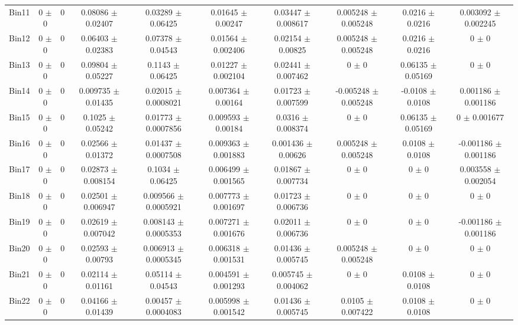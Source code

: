 \begin{tabular}{@{\extracolsep{4pt}}lccccccccc@{}}
     Bin11 & 0 $\pm$ 0 & 0 & 0.08086 $\pm$ 0.02407 & 0.03289 $\pm$ 0.06425 & 0.01645 $\pm$ 0.00247 & 0.03447 $\pm$ 0.008617 & 0.005248 $\pm$ 0.005248 & 0.0216 $\pm$ 0.0216 & 0.003092 $\pm$ 0.002245 \\ 
     Bin12 & 0 $\pm$ 0 & 0 & 0.06403 $\pm$ 0.02383 & 0.07378 $\pm$ 0.04543 & 0.01564 $\pm$ 0.002406 & 0.02154 $\pm$ 0.00825 & 0.005248 $\pm$ 0.005248 & 0.0216 $\pm$ 0.0216 & 0 $\pm$ 0 \\ 
     Bin13 & 0 $\pm$ 0 & 0 & 0.09804 $\pm$ 0.05227 & 0.1143 $\pm$ 0.06425 & 0.01227 $\pm$ 0.002104 & 0.02441 $\pm$ 0.007462 & 0 $\pm$ 0 & 0.06135 $\pm$ 0.05169 & 0 $\pm$ 0 \\ 
     Bin14 & 0 $\pm$ 0 & 0 & 0.009735 $\pm$ 0.01435 & 0.02015 $\pm$ 0.0008021 & 0.007364 $\pm$ 0.00164 & 0.01723 $\pm$ 0.007599 & -0.005248 $\pm$ 0.005248 & -0.0108 $\pm$ 0.0108 & 0.001186 $\pm$ 0.001186 \\ 
     Bin15 & 0 $\pm$ 0 & 0 & 0.1025 $\pm$ 0.05242 & 0.01773 $\pm$ 0.0007856 & 0.009593 $\pm$ 0.00184 & 0.0316 $\pm$ 0.008374 & 0 $\pm$ 0 & 0.06135 $\pm$ 0.05169 & 0 $\pm$ 0.001677 \\ 
     Bin16 & 0 $\pm$ 0 & 0 & 0.02566 $\pm$ 0.01372 & 0.01437 $\pm$ 0.0007508 & 0.009363 $\pm$ 0.001883 & 0.001436 $\pm$ 0.00626 & 0.005248 $\pm$ 0.005248 & 0.0108 $\pm$ 0.0108 & -0.001186 $\pm$ 0.001186 \\ 
     Bin17 & 0 $\pm$ 0 & 0 & 0.02873 $\pm$ 0.008154 & 0.1034 $\pm$ 0.06425 & 0.006499 $\pm$ 0.001565 & 0.01867 $\pm$ 0.007734 & 0 $\pm$ 0 & 0 $\pm$ 0 & 0.003558 $\pm$ 0.002054 \\ 
     Bin18 & 0 $\pm$ 0 & 0 & 0.02501 $\pm$ 0.006947 & 0.009566 $\pm$ 0.0005921 & 0.007773 $\pm$ 0.001697 & 0.01723 $\pm$ 0.006736 & 0 $\pm$ 0 & 0 $\pm$ 0 & 0 $\pm$ 0 \\ 
     Bin19 & 0 $\pm$ 0 & 0 & 0.02619 $\pm$ 0.007042 & 0.008143 $\pm$ 0.0005353 & 0.007271 $\pm$ 0.001676 & 0.02011 $\pm$ 0.006736 & 0 $\pm$ 0 & 0 $\pm$ 0 & -0.001186 $\pm$ 0.001186 \\ 
     Bin20 & 0 $\pm$ 0 & 0 & 0.02593 $\pm$ 0.00793 & 0.006913 $\pm$ 0.0005345 & 0.006318 $\pm$ 0.001531 & 0.01436 $\pm$ 0.005745 & 0.005248 $\pm$ 0.005248 & 0 $\pm$ 0 & 0 $\pm$ 0 \\ 
     Bin21 & 0 $\pm$ 0 & 0 & 0.02114 $\pm$ 0.01161 & 0.05114 $\pm$ 0.04543 & 0.004591 $\pm$ 0.001293 & 0.005745 $\pm$ 0.004062 & 0 $\pm$ 0 & 0.0108 $\pm$ 0.0108 & 0 $\pm$ 0 \\ 
     Bin22 & 0 $\pm$ 0 & 0 & 0.04166 $\pm$ 0.01439 & 0.00457 $\pm$ 0.0004083 & 0.005998 $\pm$ 0.001542 & 0.01436 $\pm$ 0.005745 & 0.0105 $\pm$ 0.007422 & 0.0108 $\pm$ 0.0108 & 0 $\pm$ 0 \\ 

\end{tabular}
